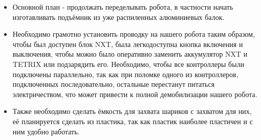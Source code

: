 \begin{enumerate}
    \begin{itemize}
    	\item Основной план - продолжать переделывать робота, в частности начать изготавливать подъёмник из уже распиленных алюминиевых балок.
	\item Необходимо грамотно установить проводку на нашего робота таким образом, чтобы был доступен блок NXT, была легкодоступна кнопка включения и выключения, чтобы можно было оперативно заменить аккумулятор NXT и TETRIX или подзарядить его. Необходимо, чтобы все контроллеры были подключены параллельно, так как при поломке одного из контроллеров, подключенных последовательно, остальные перестанут питаться электричеством, что может привести к полной демобилизации нашего робота.
    	\item Также необходимо сделать ёмкость для захвата шариков с захватом для них, её планируется сделать из пластика, так как пластик наиболее пластичен и с ним удобно работать.
    \end{itemize}
   \end{enumerate} \fillpage